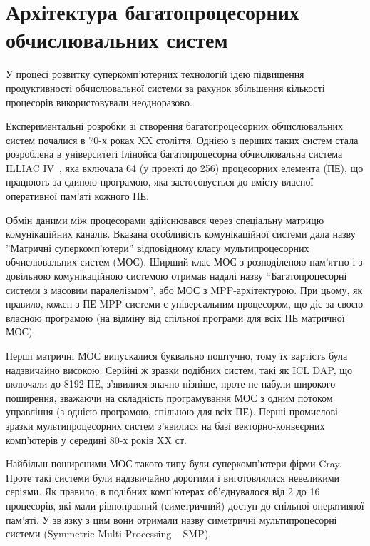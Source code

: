 \section{Архітектура багатопроцесорних обчислювальних систем}

У процесі розвитку суперкомп'ютерних технологій ідею підвищення продуктивності обчислювальної системи за рахунок збільшення кількості процесорів використовували неодноразово. 

Експериментальні розробки зі створення багатопроцесорних обчислювальних систем почалися в 70-х роках XX століття. Однією з перших таких систем стала розроблена в університеті Ілінойса багатопроцесорна обчислювальна система ILLIAC IV~\cite{illiac4}, яка включала 64 (у проекті до 256) процесорних елемента (ПЕ), що працюють за єдиною програмою, яка застосовується до вмісту власної оперативної пам'яті кожного ПЕ. 

Обмін даними між процесорами здійснювався через спеціальну матрицю комунікаційних каналів. Вказана особливість комунікаційної системи дала назву ''Матричні суперкомп'ютери'' відповідному класу мультипроцесорних обчислювальних систем (МОС). Ширший клас МОС з розподіленою пам'яттю і з довільною комунікаційною системою отримав надалі назву “Багатопроцесорні системи з масовим паралелізмом”, або МОС з MPP-архітектурою. При цьому, як правило, кожен з ПЕ MPP системи є універсальним процесором, що діє за своєю власною програмою (на відміну від спільної програми для всіх ПЕ матричної МОС).

Перші матричні МОС випускалися буквально поштучно, тому їх вартість була надзвичайно високою. Серійні ж зразки подібних систем, такі як ICL DAP, що включали до 8192 ПЕ, з'явилися значно пізніше, проте не набули широкого поширення, зважаючи на складність програмування МОС з одним потоком управління (з однією програмою, спільною для всіх ПЕ). Перші промислові зразки мультипроцесорних систем з'явилися на базі век\-тор\-но-кон\-ве\-єр\-них комп'ютерів у середині 80-х років XX ст. 

Найбільш поширеними МОС такого типу були суперкомп'ютери фірми Cray. Проте такі системи були надзвичайно дорогими і виготовлялися невеликими серіями. Як правило, в подібних комп'ютерах об'єднувалося від 2 до 16 процесорів, які мали рівноправний (симетричний) доступ до спільної оперативної пам'яті. У зв'язку з цим вони отримали назву симетричні мультипроцесорні системи (Symmetric Multi-Processing – SMP).


